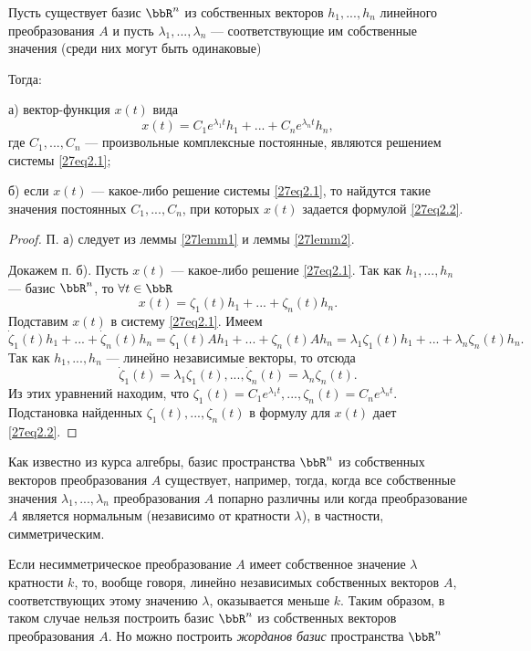 \begin{thm}\label{27thm1}
Пусть существует базис $\bbR^n$ из собственных векторов $h_1,...,h_n$ линейного преобразования $A$ и пусть $\lambda_1,...,\lambda_n$ --- соответствующие им собственные значения (среди них могут быть одинаковые)

Тогда:

а) вектор-функция $x(t)$ вида
\begin{equation}\label{27eq2.2}
x(t)=C_1e^{\lambda_1 t}h_1+...+C_ne^{\lambda_n t}h_n,
\end{equation}
где  $C_1,...,C_n$ --- произвольные комплексные постоянные, являются решением системы \eqref{27eq2.1};

б) если $x(t)$ --- какое-либо решение системы \eqref{27eq2.1}, то найдутся такие значения постоянных $C_1,...,C_n$, при которых $x(t)$ задается формулой \eqref{27eq2.2}.
\end{thm}
\begin{proof}
П. а)  следует из леммы \ref{27lemm1} и леммы \ref{27lemm2}. 

Докажем п. б). Пусть $x(t)$ --- какое-либо решение \eqref{27eq2.1}. Так как $h_1,...,h_n$ --- базис $\bbR^n$, то $\forall t\in \bbR$
$$
x(t)=\zeta_1(t)h_1+...+\zeta_n(t)h_n.
$$
Подставим $x(t)$ в систему \eqref{27eq2.1}. Имеем
$$
\dot{\zeta}_1(t)h_1+...+\dot\zeta_n(t)h_n=\zeta_1(t)Ah_1+...+\zeta_n(t)Ah_n=\lambda_1\zeta_1(t)h_1+...+\lambda_n\zeta_n(t)h_n.
$$
Так как $h_1,...,h_n$ --- линейно независимые векторы, то отсюда
$$
\dot{\zeta}_1(t)=\lambda_1\zeta_1(t),...,\dot{\zeta}_n(t)=\lambda_n\zeta_n(t).
$$
Из этих уравнений находим, что $\zeta_1(t)=C_1e^{\lambda_1t},...,\zeta_n(t)=C_ne^{\lambda_n t}$. Подстановка найденных $\zeta_1(t),...,\zeta_n(t)$ в формулу для $x(t)$ дает \eqref{27eq2.2}.
\end{proof}

Как известно из курса алгебры, базис пространства $\bbR^n$ из собственных векторов преобразования $A$ существует, например, тогда, когда все собственные значения $\lambda_1,...,\lambda_n$ преобразования $A$ попарно различны или когда преобразование $A$ является нормальным (независимо от кратности $\lambda$), в частности, симметрическим.

Если несимметрическое преобразование $A$ имеет собственное значение  $\lambda$ кратности $k$, то, вообще говоря, линейно независимых собственных векторов $A$, соответствующих этому значению $\lambda$, оказывается меньше $k$. Таким образом, в таком случае нельзя построить базис $\bbR^n$ из собственных векторов преобразования $A$. Но можно построить \textit{жорданов базис} пространства $\bbR^n$

